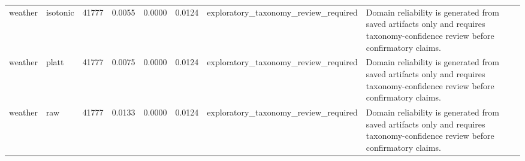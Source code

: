 \begin{tabular}{llllllll}
weather & isotonic & 41777 & 0.0055 & 0.0000 & 0.0124 & exploratory\_taxonomy\_review\_required & Domain reliability is generated from saved artifacts only and requires taxonomy-confidence review before confirmatory claims. \\
weather & platt & 41777 & 0.0075 & 0.0000 & 0.0124 & exploratory\_taxonomy\_review\_required & Domain reliability is generated from saved artifacts only and requires taxonomy-confidence review before confirmatory claims. \\
weather & raw & 41777 & 0.0133 & 0.0000 & 0.0124 & exploratory\_taxonomy\_review\_required & Domain reliability is generated from saved artifacts only and requires taxonomy-confidence review before confirmatory claims. \\
\bottomrule
\end{tabular}
